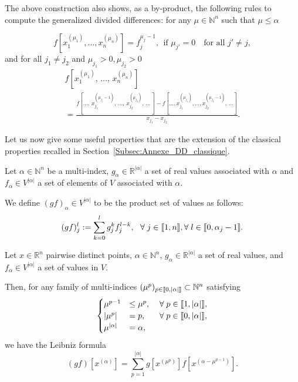 \documentclass[AHL,Unicode,longabstracts]{cedram}
\newcommand{\llbracket}{\mathopen{[\mkern -2.7mu[}}
\newcommand{\rrbracket}{\mathclose{]\mkern -2.7mu]}}
\newcommand{\inter}[2]{\llbracket #1,#2 \rrbracket}
\newcommand{\N}{\mathbb{N}}
\newcommand{\R}{\mathbb{R}}
\let\oldforall\forall
\renewcommand*{\forall}{\mathrel{\oldforall}}
\begin{document}
The above construction also shows, as a by-product, the following rules to compute the generalized divided differences: for any $\mu\in \N^n$ such that $\mu\leq \alpha$

\begin{equation}\label{rule1}
f\left[x_1^{(\mu_1)},\dotsc,x_n^{(\mu_n)}\right] = f_j^{\mu_j-1}, \ \ \text{if }\mu_{j'}=0\quad\text{for all }j'\neq j,
\end{equation}
and for all $j_1\neq j_2$ and $\mu_{j_1}>0, \mu_{j_2}>0$
\begin{multline}\label{rule2}
f\left[x_1^{(\mu_1)}\!\!,\,\dotsc,\,x_n^{(\mu_n)}\right]\\
= \frac{f\left[\dotsc,\,x_{j_1}^{(\mu_{j_1}-1)}\!,\,\dotsc,\,x_{j_2}^{(\mu_{j_2})}\!,\,\dotsc\,\right] - f\left[\dotsc,x_{j_1}^{(\mu_{j_1})}\!,\dotsc,x_{j_2}^{(\mu_{j_2}-1)}\!,\,\dotsc\right]}{x_{j_1}-x_{j_2}}.
\end{multline}



Let us now give some useful properties that are the extension of the classical properties recalled in Section~\ref{Subsec:Annexe_DD_classique}.
\begin{defi}\label{Defi:produit_GDD}
Let $\alpha\in \N^n$ be a multi-index, $g_\alpha\in \R^{|\alpha|}$ a set of real values associated with $\alpha$ and $f_\alpha\in V^{|\alpha|}$ a set of elements of $V$ associated with $\alpha$.

We define $(gf)_\alpha\in V^{|\alpha|}$ to be the product set of values as follows:
\[
(gf)_j^l := \sum_{k=0}^l g_j^k f_j^{l-k}, \ \ \forall j\in \inter{1}{n}, \forall l\in \inter{0}{\alpha_j-1}.
\]
\end{defi}

\begin{prop}\label{Prop:GDD_Leibniz}
Let $x\in \R^n$ pairwise distinct points, $\alpha\in \N^n$, $g_\alpha\in \R^{|\alpha|}$ a set of real values, and $f_\alpha\in V^{|\alpha|}$ a set of values in $V$.

Then, for any family of multi-indices $(\mu^p)_{p\in \inter{0}{|\alpha|}} \subset \N^n $ satisfying
\begin{equation}\label{prop_muk}
\begin{cases}
\mu^{p-1}&\leq \mu^{p}, \mkern20mu \forall p\in\inter{1}{|\alpha|},\\
|\mu^p| &= p, \mkern30mu \forall p\in \inter{0}{|\alpha|},\\
\mu^{|\alpha|}&=\alpha,
\end{cases}
\end{equation}
we have the Leibniz formula
\[
(gf)\left[x^{(\alpha)}\right] = \sum_{p=1}^{|\alpha|} g\left[x^{(\mu^p)}\right] f\left[x^{(\alpha-\mu^{p-1})}\right].
\]
\end{prop}
\end{document}
